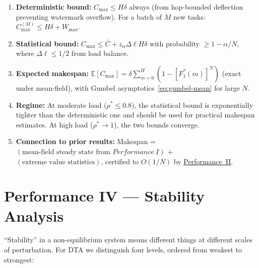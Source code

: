 \documentclass[11pt,a4paper]{article}
\newcommand{\rhostar}{\rho^{*}}
\newcommand{\Wmax}{W_{\max}}
\newcommand{\Dl}{\Delta\ell}
\newcommand{\Cmax}{C_{\max}}
\newcommand{\Cbar}{\bar{C}}
\begin{document}
\begin{enumerate}
  \item \textbf{Deterministic bound:}
        $\Cmax \leq H\delta$ always
        (from hop-bounded deflection preventing watermark overflow).
        For a batch of $M$ new tasks: $\Cmax^{(M)} \leq H\delta + \Wmax$.

  \item \textbf{Statistical bound:}
        $\Cmax \leq \Cbar + z_\alpha \Dl H\delta$
        with probability $\geq 1-\alpha/N$,
        where $\Dl \leq 1/2$ from load balance.

  \item \textbf{Expected makespan:}
        $\mathbb{E}[\Cmax] = \delta\sum_{m=0}^{H}(1-[F_1^*(m)]^N)$
        (exact under mean-field), with Gumbel asymptotics~\eqref{eq:gumbel-mean}
        for large $N$.

  \item \textbf{Regime:} At moderate load ($\rhostar \leq 0.8$),
        the statistical bound is exponentially tighter than the
        deterministic one and should be used for practical makespan estimates.
        At high load ($\rhostar \to 1$), the two bounds converge.

  \item \textbf{Connection to prior results:}
        Makespan = $(\text{mean-field steady state from } \hyperref[chap:load_balance]{Performance~I})$
        $+$ $(\text{extreme value statistics})$,
        certified to $O(1/N)$ by \hyperref[chap:kinetic_theory]{Performance~II}.
\end{enumerate}


\section*{Performance IV --- Stability Analysis}
\label{chap:stability}

\setcounter{section}{0}

\begingroup\let\rho\varrho
``Stability'' in a non-equilibrium system means different things at different
scales of perturbation.
For DTA we distinguish four levels, ordered from weakest to strongest:
\end{document}
